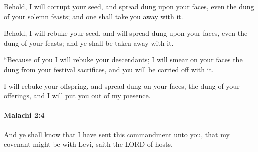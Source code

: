 			Behold, I will corrupt your seed, and spread dung upon your faces, even the dung of your solemn feasts; and one shall take you away with it.

			\begin{versebox}
					\item[BHS] 
					\item[LXX] 
					\item[ASV] Behold, I will rebuke your seed, and will spread dung upon your faces, even the dung of your feasts; and ye shall be taken away with it.
					\item[NIV] “Because of you I will rebuke your descendants; I will smear on your faces the dung from your festival sacrifices, and you will be carried off with it.
					\item[NRSV] I will rebuke your offspring, and spread dung on your faces, the dung of your offerings, and I will put you out of my presence.
			\end{versebox}

		\paragraph{Malachi 2:4} %
			\label{MALACHI-2-4}

			And ye shall know that I have sent this commandment unto you, that my covenant might be with Levi, saith the LORD of hosts.

